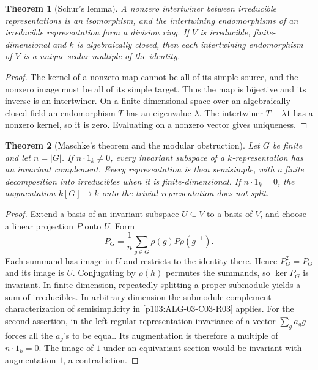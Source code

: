 \documentclass[11pt,oneside,openany]{book}
\newtheorem{theorem}{Theorem}[chapter]
\theoremstyle{definition}
\theoremstyle{remark}
\begin{document}
\begin{theorem}[Schur's lemma]
\label{p103:ALG-07-C01-R02}
A nonzero intertwiner between irreducible representations is an
isomorphism, and the intertwining endomorphisms of an irreducible
representation form a division ring. If \(V\) is irreducible,
finite-dimensional and \(k\) is algebraically closed, then each
intertwining endomorphism of \(V\) is a unique scalar multiple of the
identity.
\end{theorem}

\begin{proof}
The kernel of a nonzero map cannot be all of its simple source, and
the nonzero image must be all of its simple target. Thus the map
is bijective and its inverse is an intertwiner. On a finite-dimensional
space over an algebraically closed field an endomorphism \(T\) has an
eigenvalue \(\lambda\). The intertwiner \(T-\lambda 1\) has a nonzero
kernel, so it is zero. Evaluating on a nonzero vector gives uniqueness.
\end{proof}

\begin{theorem}[Maschke's theorem and the modular obstruction]
\label{p103:ALG-07-C01-R03}
Let \(G\) be finite and let \(n=|G|\). If \(n\cdot 1_k\ne 0\), every
invariant subspace of a \(k\)-representation has an invariant
complement. Every representation is then semisimple, with a finite
decomposition into irreducibles when it is finite-dimensional.
If \(n\cdot 1_k=0\), the augmentation \(k[G]\to k\) onto the trivial
representation does not split.
\end{theorem}

\begin{proof}
Extend a basis of an invariant subspace \(U\subseteq V\) to a basis of
\(V\), and choose a linear projection \(P\) onto \(U\). Form
\[
P_G=\frac{1}{n}\sum_{g\in G}\rho(g)P\rho(g^{-1}).
\]
Each summand has image in \(U\) and restricts to the identity there.
Hence \(P_G^2=P_G\) and its image is \(U\). Conjugating by \(\rho(h)\)
permutes the summands, so \(\ker P_G\) is invariant. In finite dimension,
repeatedly splitting a proper submodule yields a sum of irreducibles.
In arbitrary dimension the submodule complement characterization
of semisimplicity in \ref{p103:ALG-03-C03-R03} applies.
For the second assertion, in the left regular representation invariance
of a vector \(\sum_g a_g g\) forces all the \(a_g\)'s to be equal.
Its augmentation is therefore a multiple of \(n\cdot1_k=0\).
The image of \(1\) under an equivariant section would be invariant
with augmentation \(1\), a contradiction.
\end{proof}
\end{document}
